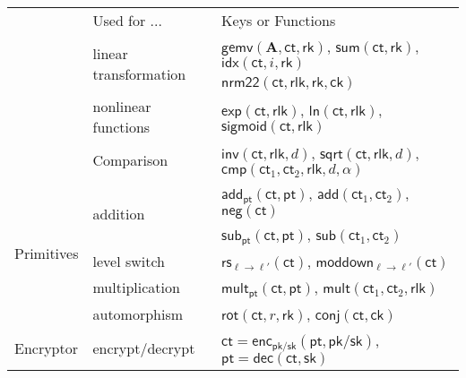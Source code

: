 \documentclass[preview]{standalone}
\begin{document}
\begin{table}
\footnotesize
\centering
\begin{tabular}{|l|l|l|}
\hline
                                  &Used for ...                    &Keys or Functions\\
\hhline{|=|=|=|}
\multirow{4}{*}{Advanced}         &\multirow{2}{*}{linear transformation}&$\mathsf{gemv}(\bm{A},\mathsf{ct},\mathsf{rk})$, $\mathsf{sum}(\mathsf{ct},\mathsf{rk})$, $\mathsf{idx}(\mathsf{ct},i,\mathsf{rk})$\\
                                  &                                      &$\mathsf{nrm22}(\mathsf{ct},\mathsf{rlk},\mathsf{rk},\mathsf{ck})$\\
                                  \cline{2-3}
                                  &nonlinear functions                   &$\mathsf{exp}(\mathsf{ct},\mathsf{rlk})$, $\mathsf{ln}(\mathsf{ct},\mathsf{rlk})$, $\mathsf{sigmoid}(\mathsf{ct},\mathsf{rlk})$\\
                                  \cline{2-3}
                                  &Comparison                            &$\mathsf{inv}(\mathsf{ct},\mathsf{rlk},d)$, $\mathsf{sqrt}(\mathsf{ct},\mathsf{rlk},d)$, $\mathsf{cmp}(\mathsf{ct}_1,\mathsf{ct}_2,\mathsf{rlk},d,\alpha)$\\
\hline
\multirow{5}{*}{Primitives}       &\multirow{2}{*}{addition}             &$\mathsf{add_{pt}}(\mathsf{ct},\mathsf{pt})$, $\mathsf{add}(\mathsf{ct}_1,\mathsf{ct}_2)$, $\mathsf{neg}(\mathsf{ct})$\\
                                  &                                      &$\mathsf{sub_{pt}}(\mathsf{ct},\mathsf{pt})$, $\mathsf{sub}(\mathsf{ct}_1,\mathsf{ct}_2)$\\
                                  \cline{2-3}
                                  &level switch                          &$\mathsf{rs}_{\ell\rightarrow\ell'}(\mathsf{ct})$, $\mathsf{moddown}_{\ell\rightarrow\ell'}(\mathsf{ct})$\\
                                  \cline{2-3}
                                  &multiplication                        &$\mathsf{mult_{pt}}(\mathsf{ct},\mathsf{pt})$, $\mathsf{mult}(\mathsf{ct}_1,\mathsf{ct}_2,\mathsf{rlk})$\\
                                  \cline{2-3}
                                  &automorphism                          &$\mathsf{rot}(\mathsf{ct},r,\mathsf{rk})$, $\mathsf{conj}(\mathsf{ct},\mathsf{ck})$\\
\hline
Encryptor                         &encrypt/decrypt                       &$\mathsf{ct}=\mathsf{enc_{pk/sk}}(\mathsf{pt},\mathsf{pk}/\mathsf{sk})$, $\mathsf{pt}=\mathsf{dec}(\mathsf{ct},\mathsf{sk})$\\

\end{tabular}
\end{table}
\end{document}
